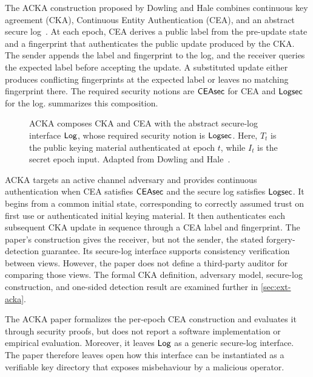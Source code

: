 The ACKA construction proposed by Dowling and Hale combines continuous key agreement (CKA),
Continuous Entity Authentication (CEA), and an abstract secure
log~\cite{dowling2023acka}. At each epoch, CEA derives a public label from the
pre-update state and a fingerprint that authenticates the public update produced by the
CKA. The sender appends the label and fingerprint to the log,
and the receiver queries the expected label before accepting the
update. A substituted update either produces conflicting
fingerprints at the expected label or leaves no matching fingerprint
there. The required security notions are $\mathsf{CEAsec}$ for
CEA and $\mathsf{Logsec}$ for the log.
 summarizes this composition.

\begin{figure}[H]
\centering

\caption[ACKA composition]{ACKA composes CKA and CEA with the abstract secure-log interface
$\mathsf{Log}$, whose required security notion is $\mathsf{Logsec}$. Here, $T_t$ is the public keying material
authenticated at epoch $t$, while $I_t$ is the secret epoch input. Adapted from Dowling and
Hale~\cite{dowling2023acka}.}
\label{fig:bg-acka}
\end{figure}

ACKA targets an active channel adversary and provides continuous authentication when CEA satisfies
$\mathsf{CEAsec}$ and the secure log satisfies $\mathsf{Logsec}$. It begins from
a common initial state, corresponding to correctly assumed trust on first use or authenticated
initial keying material. It then authenticates each subsequent CKA
update in sequence through a CEA label and fingerprint. The
paper's construction gives the receiver, but not the sender, the stated forgery-detection
guarantee. Its secure-log interface supports consistency verification
between views. However, the paper does not define a third-party
auditor for comparing those views. The formal CKA definition,
adversary model, secure-log construction, and one-sided detection result are examined further in
\cref{sec:ext-acka}.

The ACKA paper formalizes the per-epoch CEA construction and evaluates it through security proofs, but
does not report a software implementation or empirical
evaluation. Moreover, it leaves $\mathsf{Log}$ as a generic secure-log
interface. The paper therefore leaves open how this interface can
be instantiated as a verifiable key directory that exposes misbehaviour by a malicious operator.

